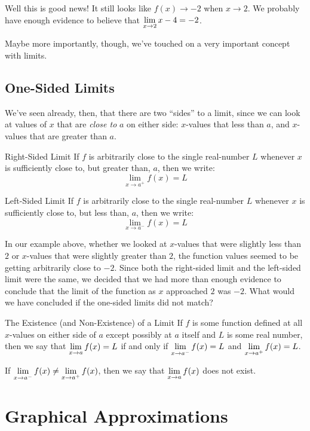 Well this is good news! It still looks like $f(x) \to -2$ when $x\to 2$.
We probably have enough evidence to believe that $\displaystyle \lim_{x\to 2}x-4 = -2$.

Maybe more importantly, though, we've touched on a very important concept with limits.

\subsection*{One-Sided Limits}

We've seen already, then, that there are two ``sides'' to a limit, since we can look at values of $x$ that are \textit{close to} $a$ on either side: $x$-values that less than $a$, and $x$-values that are greater than $a$.

\begin{defn}{Right-Sided Limit}
  If $f$ is arbitrarily close to the single real-number $L$ whenever $x$ is sufficiently close to, but greater than, $a$, then we write:
  \[ \lim_{x\to a^+} f(x)=L\]
\end{defn}

\begin{defn}{Left-Sided Limit}
  If $f$ is arbitrarily close to the single real-number $L$ whenever $x$ is sufficiently close to, but less than, $a$, then we write:
  \[ \lim_{x\to a^-} f(x)=L\]
\end{defn}

In our example above, whether we looked at $x$-values that were slightly less than $2$ or $x$-values that were slightly greater than $2$, the function values seemed to be getting arbitrarily close to $-2$.
Since both the right-sided limit and the left-sided limit were the same, we decided that we had more than enough evidence to conclude that the limit of the function as $x$ approached $2$ was $-2$.
What would we have concluded if the one-sided limits did not match?

\begin{thm}{The Existence (and Non-Existence) of a Limit}
  If $f$ is some function defined at all $x$-values on either side of $a$ except possibly at $a$ itself and $L$ is some real number, then we say that $\displaystyle \lim_{x\to a} f(x) = L$ if and only if $\displaystyle \lim_{x\to a^-}f(x) = L$ and $\displaystyle \lim_{x\to a^+} f(x) = L$.

  If $\displaystyle \lim_{x\to a^-} f(x) \neq \displaystyle \lim_{x\to a^+} f(x)$, then we say that $\displaystyle \lim_{x\to a} f(x)$ does not exist.
\end{thm}

\section*{Graphical Approximations}



